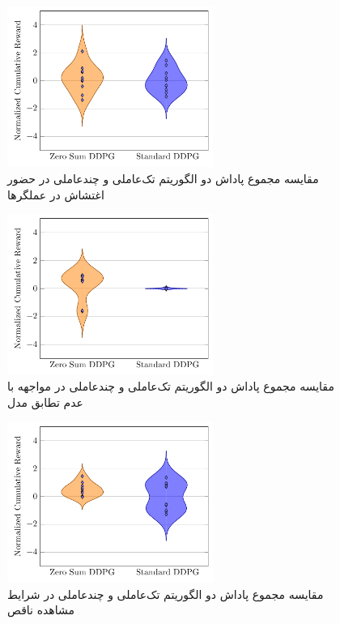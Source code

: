 \begin{figure}[H]
	\centering
	\includegraphics[width=0.6\textwidth]{plots/ddpg/violin_plot/actuator_disturbance}
	\caption{مقایسه مجموع پاداش دو الگوریتم تک‌عاملی و چندعاملی  در حضور اغتشاش در عملگرها}
\end{figure}

\begin{figure}[H]
	\centering
	\includegraphics[width=0.6\textwidth]{plots/ddpg/violin_plot/model_mismatch}
	\caption{مقایسه مجموع پاداش دو الگوریتم تک‌عاملی و چندعاملی  در مواجهه با عدم تطابق مدل}
\end{figure}

\begin{figure}[H]
	\centering
	\includegraphics[width=0.6\textwidth]{plots/ddpg/violin_plot/partial_observation}
	\caption{مقایسه مجموع پاداش دو الگوریتم تک‌عاملی و چندعاملی  در شرایط مشاهده ناقص}
\end{figure}

